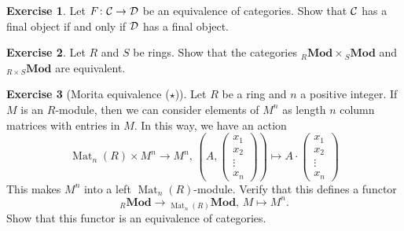 \documentclass[11pt]{amsbook}
\DeclareMathOperator\Mod{{\bf{Mod}}}
\DeclareMathOperator\Mat{Mat}
\def\Mod{\mathbf{Mod}}
\theoremstyle{plain}
\theoremstyle{definition}
\newtheorem{exercise}{Exercise}
\begin{document}
\begin{exercise} \label{exc:equivalence-final}
Let $F\colon {\mathcal{C}} \to {\mathcal{D}}$ be an equivalence of categories. Show that ${\mathcal{C}}$ has a final object if and only if ${\mathcal{D}}$ has a final object.
\end{exercise}


\begin{exercise}
Let $R$ and $S$ be rings. Show that the categories ${}_R\Mod\times {}_S\Mod$ and ${}_{R\times S}\Mod$ are equivalent.
\end{exercise}


\begin{exercise}[Morita equivalence ($\star$)]
Let $R$ be a ring and $n$ a positive integer.  If $M$ is an $R$-module, then we can consider elements of $M^n$ as length $n$ column matrices with entries in $M$. In this way, we have an action
\[
	\Mat_n(R) \times M^n \to M^n,\, (A,    \begin{pmatrix} x_1 \\ x_2 \\ \vdots \\ x_n \end{pmatrix} ) \mapsto
	A \cdot   \begin{pmatrix} x_1 \\ x_2 \\ \vdots \\ x_n \end{pmatrix}
\]
This makes $M^n$ into a left $\Mat_n(R)$-module. Verify that this defines a functor
\[
	{}_R\Mod \to {}_{\Mat_n(R)}\Mod,\, M \mapsto M^n.
\]
Show that this functor is an equivalence of categories.
\end{exercise}


\end{document}

